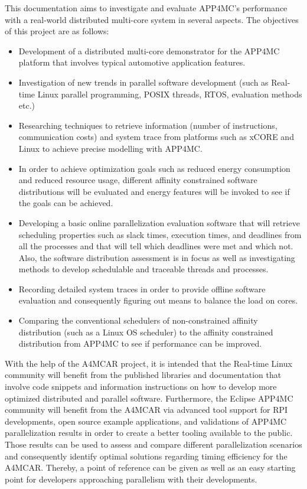 This documentation aims to investigate and evaluate APP4MC's performance with a real-world distributed multi-core system in several aspects. The objectives of this project are as follows:
\begin{itemize}
	\item Development of a distributed multi-core demonstrator for the APP4MC platform that involves typical automotive application features.
	\item Investigation of new trends in parallel software development (such as Real-time Linux parallel programming, POSIX threads, RTOS, evaluation methods etc.)
	\item Researching techniques to retrieve information (number of instructions, communication costs) and system trace from platforms such as xCORE and Linux to achieve precise modelling with APP4MC.
	\item In order to achieve optimization goals such as reduced energy consumption and reduced resource usage, different affinity constrained software distributions will be evaluated and energy features will be invoked to see if the goals can be achieved.
	\item Developing a basic online parallelization evaluation software that will retrieve scheduling properties such as slack times, execution times, and deadlines from all the processes and that will tell which deadlines were met and which not. Also, the software distribution assessment is in focus as well as investigating methods to develop schedulable and traceable threads and processes.
	\item Recording detailed system traces in order to provide offline software evaluation and consequently figuring out means to balance the load on cores.
	\item Comparing the conventional schedulers of non-constrained affinity distribution (such as a Linux OS scheduler) to the affinity constrained distribution from APP4MC to see if performance can be improved.
\end{itemize}

With the help of the A4MCAR project, it is intended that the Real-time Linux community will benefit from the published libraries and documentation that involve code snippets and information instructions on how to develop more optimized distributed and parallel software. Furthermore, the Eclipse APP4MC community will benefit from the A4MCAR via advanced tool support for RPI developments, open source example applications, and validations of APP4MC parallelization results in order to create a better tooling available to the public. Those results can be used to assess and compare different parallelization scenarios and consequently identify optimal solutions regarding timing efficiency for the A4MCAR. Thereby, a point of reference can be given as well as an easy starting point for developers approaching parallelism with their developments. 

